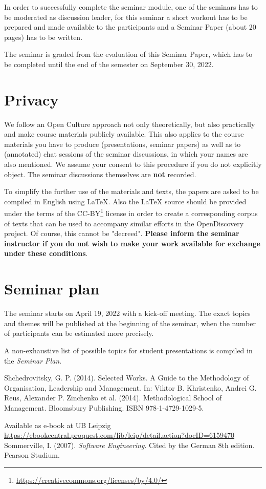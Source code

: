 \documentclass[11pt,a4paper]{article}
\begin{document}
In order to successfully complete the seminar module, one of the seminars has
to be moderated as discussion leader, for this seminar a short workout has to
be prepared and made available to the participants and a Seminar Paper (about
20 pages) has to be written.

The seminar is graded from the evaluation of this Seminar Paper, which has to
be completed until the end of the semester on September 30, 2022.

\section{Privacy}

We follow an Open Culture approach not only theoretically, but also
practically and make course materials publicly available.  This also applies
to the course materials you have to produce (presentations, seminar papers) as
well as to (annotated) chat sessions of the seminar discussions, in which your
names are also mentioned.  We assume your consent to this procedure if you do
not explicitly object.  The seminar discussions themselves are \textbf{not}
recorded.

To simplify the further use of the materials and texts, the papers are asked
to be compiled in English using {\LaTeX}.  Also the {\LaTeX} source should be
provided under the terms of the
CC-BY\footnote{\url{https://creativecommons.org/licenses/by/4.0/}} license in
order to create a corresponding corpus of texts that can be used to accompany
similar efforts in the OpenDiscovery project. Of course, this cannot be
"decreed". \textbf{Please inform the seminar instructor if you do not wish to
  make your work available for exchange under these conditions}.

\section{Seminar plan}

The seminar starts on April 19, 2022 with a kick-off meeting.  The exact
topics and themes will be published at the beginning of the seminar, when the
number of participants can be estimated more precisely.

A non-exhaustive list of possible topics for student presentations is compiled
in the \emph{Seminar Plan}.

\begin{thebibliography}{xxx}
 Shchedrovitsky, G. P. (2014). Selected Works. A Guide to the
  Methodology of Organisation, Leadership and Management. In: Viktor
  B. Khristenko, Andrei G. Reus, Alexander P. Zinchenko et
  al. (2014). Methodological School of Management. Bloomsbury Publishing.
  ISBN 978-1-4729-1029-5.

  Available as e-book at UB Leipzig\\
  \url{https://ebookcentral.proquest.com/lib/leip/detail.action?docID=6159470}
 Sommerville, I. (2007).  \emph{Software Engineering}.
  Cited by the German 8th edition. Pearson Studium.
\end{thebibliography}
\end{document}

